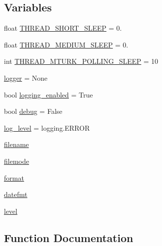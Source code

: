 \subsection*{Variables}
\begin{DoxyCompactItemize}
\item 
float \hyperlink{namespaceparlai_1_1mturk_1_1core_1_1dev_1_1shared__utils_aa15c4a7a4fc2e66170396fb0c5699682}{T\+H\+R\+E\+A\+D\+\_\+\+S\+H\+O\+R\+T\+\_\+\+S\+L\+E\+EP} = 0.
\item 
float \hyperlink{namespaceparlai_1_1mturk_1_1core_1_1dev_1_1shared__utils_acff886a06ebd11d1c764692f86b2eb97}{T\+H\+R\+E\+A\+D\+\_\+\+M\+E\+D\+I\+U\+M\+\_\+\+S\+L\+E\+EP} = 0.
\item 
int \hyperlink{namespaceparlai_1_1mturk_1_1core_1_1dev_1_1shared__utils_a8e932a1e84c2b7e9a0b3d7c8f1c2222b}{T\+H\+R\+E\+A\+D\+\_\+\+M\+T\+U\+R\+K\+\_\+\+P\+O\+L\+L\+I\+N\+G\+\_\+\+S\+L\+E\+EP} = 10
\item 
\hyperlink{namespaceparlai_1_1mturk_1_1core_1_1dev_1_1shared__utils_a3895c93f5710cbefc7d916fa926f6c15}{logger} = None
\item 
bool \hyperlink{namespaceparlai_1_1mturk_1_1core_1_1dev_1_1shared__utils_a3bbd640c42603eb855a531319512e780}{logging\+\_\+enabled} = True
\item 
bool \hyperlink{namespaceparlai_1_1mturk_1_1core_1_1dev_1_1shared__utils_a83fe2834d36de454ed5bbc2c1e6e48ab}{debug} = False
\item 
\hyperlink{namespaceparlai_1_1mturk_1_1core_1_1dev_1_1shared__utils_a911668ae6a533d13d9076939004e517f}{log\+\_\+level} = logging.\+E\+R\+R\+OR
\item 
\hyperlink{namespaceparlai_1_1mturk_1_1core_1_1dev_1_1shared__utils_a74dd75e17c0e8fcec8cf94bf5b96fa36}{filename}
\item 
\hyperlink{namespaceparlai_1_1mturk_1_1core_1_1dev_1_1shared__utils_adaa8d49c3d0059d0d9b261d60838175b}{filemode}
\item 
\hyperlink{namespaceparlai_1_1mturk_1_1core_1_1dev_1_1shared__utils_ab1d2204f2b93a19ec977086e7f9d06b2}{format}
\item 
\hyperlink{namespaceparlai_1_1mturk_1_1core_1_1dev_1_1shared__utils_a83336eaa896a5b3f6ea12720e511e7f7}{datefmt}
\item 
\hyperlink{namespaceparlai_1_1mturk_1_1core_1_1dev_1_1shared__utils_a907236e6bd0c0e3b728a25c4925ec851}{level}
\end{DoxyCompactItemize}


\subsection{Function Documentation}
\mbox{\label{namespaceparlai_1_1mturk_1_1core_1_1dev_1_1shared__utils_aeb3b524d0d90cbea1e509a09b3dc7bf5}} 
